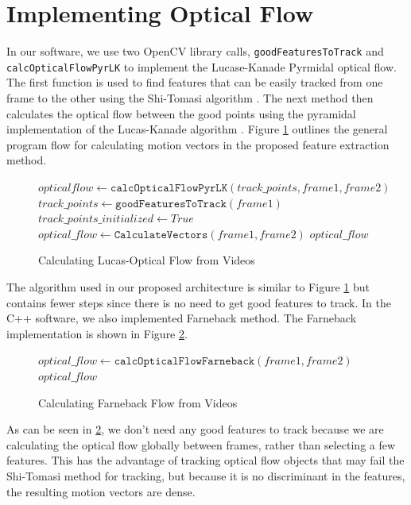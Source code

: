 \section{\label{section:vida_oflow} Implementing Optical Flow }
In our software, we use two OpenCV library calls, \texttt{goodFeaturesToTrack}
and \\
\texttt{calcOpticalFlowPyrLK} to implement the Lucase-Kanade Pyrmidal optical
flow. The first function is used to find features that can be easily tracked
from one frame to the other using the Shi-Tomasi algorithm \cite{shi1994good}.
The next method then calculates the optical flow between the good points using
the pyramidal implementation of the Lucas-Kanade algorithm
\cite{bouguet2001pyramidal}. Figure \ref{alg:lk_flow} outlines the general
program flow for calculating motion vectors in the proposed feature extraction method.

\begin{figure}[h]
\begin{algorithmic}[1]
  	\State $opticalflow \gets \texttt{calcOpticalFlowPyrLK}(track\_points, frame1, frame2)$
  \Else
  	\State $track\_points \gets \texttt{goodFeaturesToTrack}(frame1)$
	  \State $track\_points\_initialized \gets True$
	  \State $optical\_flow \gets  \texttt{CalculateVectors}(frame1, frame2)$
  \EndIf
  \Return $optical\_flow$
\EndProcedure
\end{algorithmic}
\caption{Calculating Lucas-Optical Flow from Videos}
\label{alg:lk_flow}
\end{figure}

The algorithm used in our proposed architecture is similar to Figure \ref{alg:lk_flow} but
contains fewer steps since there is no need to get good features to track.
In the C++ software, we also implemented Farneback method. The
Farneback implementation is shown in Figure \ref{alg:farneback}.

\begin{figure}[h]
\begin{algorithmic}[1]
  \State $optical\_flow \gets \texttt{calcOpticalFlowFarneback}(frame1, frame2)$\\
  \Return $optical\_flow$
\EndProcedure
\end{algorithmic}
\caption{Calculating Farneback Flow from Videos}
\label{alg:farneback}
\end{figure}

As can be seen in \ref{alg:farneback}, we don't need any good features to track
because we are calculating the optical flow globally between frames, rather than
selecting a few features. This has the advantage of tracking optical flow objects
that may fail the Shi-Tomasi method for tracking, but because it is no discriminant
in the features, the resulting motion vectors are dense.


